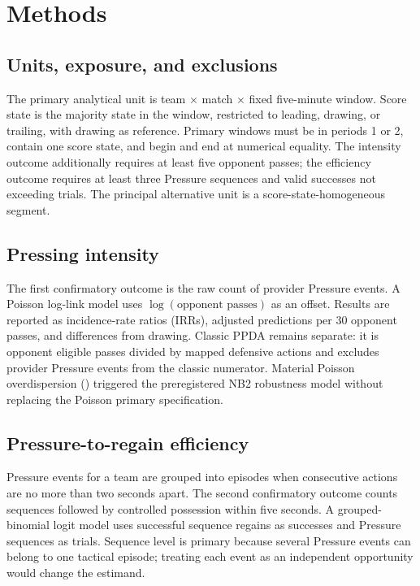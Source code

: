 \section{Methods}

\subsection{Units, exposure, and exclusions}
The primary analytical unit is team $\times$ match $\times$ fixed five-minute window. Score state is the majority state in the window, restricted to leading, drawing, or trailing, with drawing as reference. Primary windows must be in periods 1 or 2, contain one score state, and begin and end at numerical equality. The intensity outcome additionally requires at least five opponent passes; the efficiency outcome requires at least three Pressure sequences and valid successes not exceeding trials. The principal alternative unit is a score-state-homogeneous segment.

\subsection{Pressing intensity}
The first confirmatory outcome is the raw count of provider Pressure events. A Poisson log-link model uses $\log(\text{opponent passes})$ as an offset. Results are reported as incidence-rate ratios (IRRs), adjusted predictions per 30 opponent passes, and differences from drawing. Classic PPDA remains separate: it is opponent eligible passes divided by mapped defensive actions and excludes provider Pressure events from the classic numerator. Material Poisson overdispersion (\PoissonDispersion) triggered the preregistered NB2 robustness model without replacing the Poisson primary specification.

\subsection{Pressure-to-regain efficiency}
Pressure events for a team are grouped into episodes when consecutive actions are no more than two seconds apart. The second confirmatory outcome counts sequences followed by controlled possession within five seconds. A grouped-binomial logit model uses successful sequence regains as successes and Pressure sequences as trials. Sequence level is primary because several Pressure events can belong to one tactical episode; treating each event as an independent opportunity would change the estimand.

